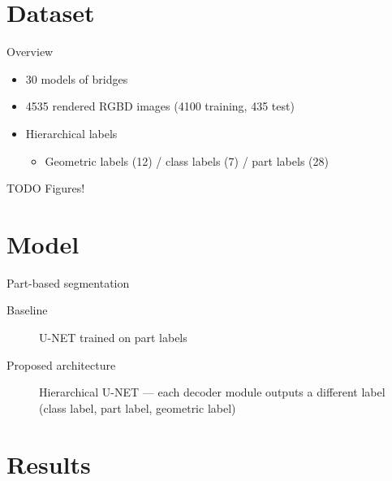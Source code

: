 \documentclass{beamer}
\begin{document}
\section{Dataset}

\begin{frame}{Overview}
  \begin{itemize}
  \item 30 models of bridges
  \item 4535 rendered RGBD images (4100 training, 435 test)
  \item Hierarchical labels
    \begin{itemize}
    \item Geometric labels (12) / class labels (7) / part labels (28)
    \end{itemize}
  \end{itemize}
\end{frame}

\begin{frame}{TODO}
  Figures!
\end{frame}

\section{Model}

\begin{frame}{Part-based segmentation}
  \begin{description}
  \item[Baseline] U-NET trained on part labels
  \item[Proposed architecture] Hierarchical U-NET --- each decoder
    module outputs a different label (class label, part label,
    geometric label)
  \end{description}
  \begin{figure}[h]\centering
    \def\svgwidth{10cm}
    
  \end{figure}
\end{frame}

\section{Results}
\end{document}
